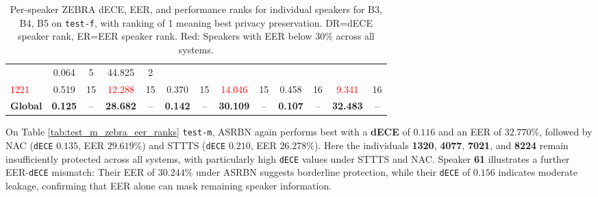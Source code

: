 \documentclass[12pt,leqno,a4paper]{article}
\begin{document}
\begin{table}[H]
\begin{tabular}{lcccccccccccc}
     & 0.064 & 5  & 44.825 & 2  \\
\textcolor{red}{1221} 
     & 0.519 & 15 & \textcolor{red}{12.288} & 15 
     & 0.370 & 15 & \textcolor{red}{14.046} & 15 
     & 0.458 & 16 & \textcolor{red}{9.341}  & 16 \\
\midrule
\textbf{Global}
& \textbf{0.125} & -- & \textbf{28.682} & --
& \textbf{0.142} & -- & \textbf{30.109} & --
& \textbf{0.107} & -- & \textbf{32.483} & -- \\
\bottomrule
\end{tabular}
\caption{Per-speaker ZEBRA dECE, EER, and performance ranks for individual speakers for B3, B4, B5 on \texttt{test-f}, with ranking of 1 meaning best privacy preservation. DR=dECE speaker rank, ER=EER speaker rank. Red: Speakers with EER below $30\%$ across all systems.}
\label{tab:test_f_zebra_eer_ranks}
\end{table}

On Table \ref{tab:test_m_zebra_eer_ranks} \texttt{test-m}, ASRBN again performs best with a \textbf{dECE} of $0.116$ and an EER of $32.770\%$, followed by NAC (\texttt{dECE} $0.135$, EER $29.619\%$) and STTTS (\texttt{dECE} $0.210$, EER $26.278\%$). Here the individuals \textbf{1320}, \textbf{4077}, \textbf{7021}, and \textbf{8224} remain insufficiently protected across all systems, with particularly high \texttt{dECE} values under STTTS and NAC. Speaker \textbf{61} illustrates a further EER-\texttt{dECE} mismatch: Their EER of $30.244\%$ under ASRBN suggests borderline protection, while their \texttt{dECE} of $0.156$ indicates moderate leakage, confirming that EER alone can mask remaining speaker information.
\end{document}
